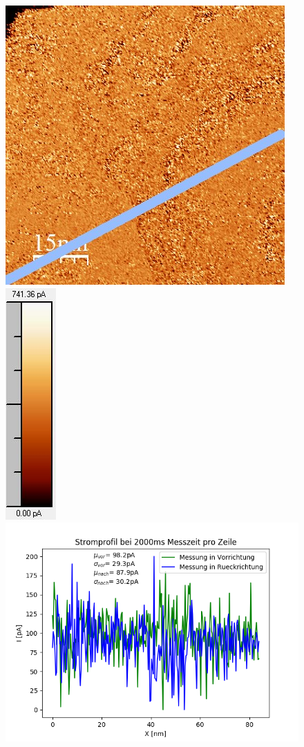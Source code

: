 \documentclass[12pt,a4paper]{article}
\begin{document}
\begin{figure}[H]
\includegraphics[scale=0.6]{Bilder/Anhang/Zeit/Strom/2_Zeit_nach_Strom.jpg}
\includegraphics[scale=0.6]{Bilder/Anhang/Zeit/Strom/2_Zeit_nach_Strom_Skala.jpg}
\includegraphics[scale=0.5]{Bilder/Anhang/Zeit/Strom/Strom_Profil_Zeit_2000.png}

\end{figure}
\end{document}

